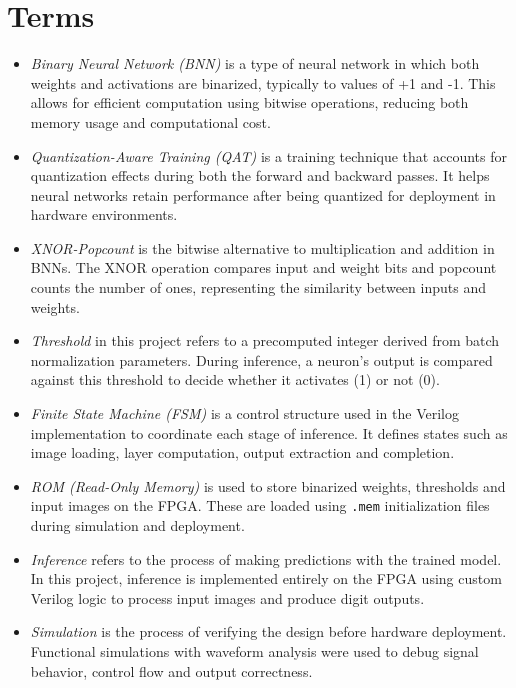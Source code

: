 \documentclass[a4paper,12pt]{report}
\begin{document}
\section{Terms}
\begin{itemize}
    \item \textit{Binary Neural Network (BNN)} is a type of neural network in which both weights and activations are binarized, typically to values of +1 and -1. This allows for efficient computation using bitwise operations, reducing both memory usage and computational cost.

    \item \textit{Quantization-Aware Training (QAT)} is a training technique that accounts for quantization effects during both the forward and backward passes. It helps neural networks retain performance after being quantized for deployment in hardware environments.

    \item \textit{XNOR-Popcount} is the bitwise alternative to multiplication and addition in BNNs. The XNOR operation compares input and weight bits and popcount counts the number of ones, representing the similarity between inputs and weights.

    \item \textit{Threshold} in this project refers to a precomputed integer derived from batch normalization parameters. During inference, a neuron's output is compared against this threshold to decide whether it activates (1) or not (0).

    \item \textit{Finite State Machine (FSM)} is a control structure used in the Verilog implementation to coordinate each stage of inference. It defines states such as image loading, layer computation, output extraction and completion.

    \item \textit{ROM (Read-Only Memory)} is used to store binarized weights, thresholds and input images on the FPGA. These are loaded using \texttt{.mem} initialization files during simulation and deployment.

    \item \textit{Inference} refers to the process of making predictions with the trained model. In this project, inference is implemented entirely on the FPGA using custom Verilog logic to process input images and produce digit outputs.

    \item \textit{Simulation} is the process of verifying the design before hardware deployment. Functional simulations with waveform analysis were used to debug signal behavior, control flow and output correctness.
\end{itemize}
\clearpage
\end{document}
